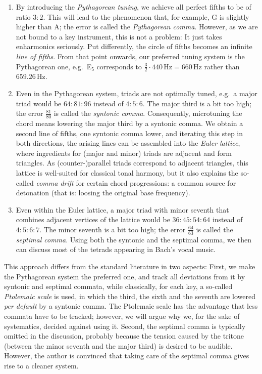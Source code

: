 \documentclass[british,11pt]{scrartcl}
\begin{document}
\begin{enumerate}
\item By introducing the \emph{Pythagorean tuning}, we achieve all perfect
  fifths to be of ratio $3:2$. This will lead to the phenomenon that, for
  example, \sharp G is slightly higher than \flat A; the error is called
  the \emph{Pythagorean comma}. However, as we are not bound to a key
  instrument, this is not a problem: It just takes
  enharmonics seriously. Put differently, the circle of fifths becomes an infinite
  \emph{line of fifths}. From that point onwards, our preferred tuning system is the
  Pythagorean one, e.g.\ E$_5$ corresponds to
  $\frac32\cdot 440\,\text{Hz}=660\,\text{Hz}$ rather than
  $659.26\,\text{Hz}$.
\item Even in the Pythagorean system, triads are not optimally tuned, e.g.\ a
  major triad would be $64:81:96$ instead of $4:5:6$. The major third is a bit
  too high; the error $\frac{81}{80}$ is called the \emph{syntonic comma}.
  Consequently, microtuning the chord means lowering the major third by a
  syntonic comma.  We obtain a second line of fifths, one syntonic comma lower,
  and iterating this step in both directions, the arising lines can be assembled
  into the \emph{Euler lattice}, where ingredients for (major and minor) triads
  are adjacent and form triangles. As (counter-)parallel triads correspond to
  adjacent triangles, this lattice is well-suited for classical tonal harmony,
  but it also explains the so-called \emph{comma drift} for certain chord
  progressions: a common source for detonation (that is: loosing
  the original base frequency).
\item {} Even within the Euler lattice, a major triad with
  minor seventh that combines adjacent vertices of the lattice would be
  $36:45:54:64$ instead of $4:5:6:7$. The minor seventh is a bit too high; the
  error $\frac{64}{63}$ is called the \emph{septimal comma}. Using both the
  syntonic and the septimal comma, we then can discuss most of the tetrads
  appearing in Bach’s vocal music.
\end{enumerate}
This approach differs from the standard literature
in two aspects: First, we make the Pythagorean system the preferred one, and track all
deviations from it by syntonic and septimal commata, while classically, for each
key, a so-called \emph{Ptolemaic scale} is used, in which the third, the sixth
and the seventh are lowered \emph{per default} by a syntonic comma. The
Ptolemaic scale has the advantage that less commata have to be tracked; however,
we will argue why we, for the sake of systematics, decided against using
it. Second, the septimal comma is typically omitted in the discussion, probably
because the tension caused by the tritone (between the minor seventh and the
major third) is desired to be audible. However, the author is convinced that
taking care of the septimal comma gives rise to a cleaner system.
\end{document}
